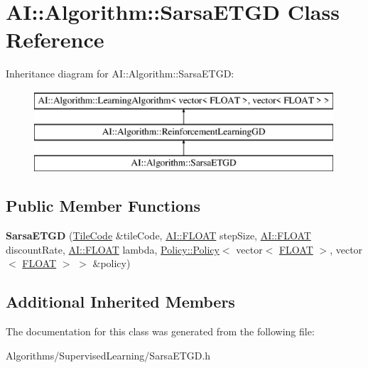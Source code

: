 \hypertarget{classAI_1_1Algorithm_1_1SarsaETGD}{\section{A\-I\-:\-:Algorithm\-:\-:Sarsa\-E\-T\-G\-D Class Reference}
\label{classAI_1_1Algorithm_1_1SarsaETGD}
}
Inheritance diagram for A\-I\-:\-:Algorithm\-:\-:Sarsa\-E\-T\-G\-D\-:\begin{figure}[H]
\begin{center}
\leavevmode
\includegraphics[height=3.000000cm]{classAI_1_1Algorithm_1_1SarsaETGD}
\end{center}
\end{figure}
\subsection*{Public Member Functions}
\begin{DoxyCompactItemize}
\item 
\hypertarget{classAI_1_1Algorithm_1_1SarsaETGD_a51da05d1ec0823c06770eaf4dc3ccdee}{{\bfseries Sarsa\-E\-T\-G\-D} (\hyperlink{classAI_1_1Algorithm_1_1TileCode}{Tile\-Code} \&tile\-Code, \hyperlink{namespaceAI_a41b74884a20833db653dded3918e05c3}{A\-I\-::\-F\-L\-O\-A\-T} step\-Size, \hyperlink{namespaceAI_a41b74884a20833db653dded3918e05c3}{A\-I\-::\-F\-L\-O\-A\-T} discount\-Rate, \hyperlink{namespaceAI_a41b74884a20833db653dded3918e05c3}{A\-I\-::\-F\-L\-O\-A\-T} lambda, \hyperlink{classAI_1_1Algorithm_1_1Policy_1_1Policy}{Policy\-::\-Policy}$<$ vector$<$ \hyperlink{namespaceAI_a41b74884a20833db653dded3918e05c3}{F\-L\-O\-A\-T} $>$, vector$<$ \hyperlink{namespaceAI_a41b74884a20833db653dded3918e05c3}{F\-L\-O\-A\-T} $>$ $>$ \&policy)}\label{classAI_1_1Algorithm_1_1SarsaETGD_a51da05d1ec0823c06770eaf4dc3ccdee}

\end{DoxyCompactItemize}
\subsection*{Additional Inherited Members}


The documentation for this class was generated from the following file\-:\begin{DoxyCompactItemize}
\item 
Algorithms/\-Supervised\-Learning/Sarsa\-E\-T\-G\-D.\-h\end{DoxyCompactItemize}
